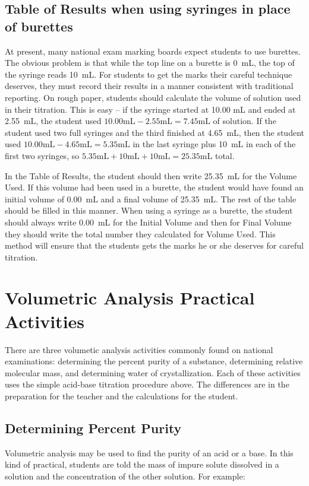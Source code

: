 \subsection{Table of Results when using syringes in place of burettes}

At present, many national exam marking boards expect students to use burettes. The obvious problem is that while the top line on a burette is 0~mL, the top of the syringe reads 10~mL. For students to get the marks their careful technique deserves, they must record their results in a manner consistent with traditional reporting. On rough paper, students should calculate the volume of solution used in their titration. This is easy -- if the syringe started at 10.00 mL and ended at 2.55~mL, the student used $10.00 \mathrm{mL} - 2.55 \mathrm{mL} = 7.45 \mathrm{mL}$ of solution. If the student used two full syringes and the third finished at 4.65~mL, then the student used $10.00 \mathrm{mL} - 4.65 \mathrm{mL} = 5.35 \mathrm{mL}$ in the last syringe plus 10~mL in each of the first two syringes, so $5.35 \mathrm{mL} + 10 \mathrm{mL} + 10 \mathrm{mL} = 25.35 \mathrm{mL}$ total.

In the Table of Results, the student should then write 25.35~mL for the Volume Used. If this volume had been used in a burette, the student would have found an initial volume of 0.00~mL and a final volume of 25.35~mL. The rest of the table should be filled in this manner. When using a syringe as a burette, the student should always write 0.00~mL for the Initial Volume and then for Final Volume they should write the total number they calculated for Volume Used. This method will ensure that the students gets the marks he or she deserves for careful titration. 

\section{Volumetric Analysis Practical Activities}

There are three volumetic analysis activities commonly found on national examinations: determining the percent purity of a substance, determining relative molecular mass, and determining water of crystallization. Each of these activities uses the simple acid-base titration procedure above. The differences are in the preparation for the teacher and the calculations for the student.

\subsection{Determining Percent Purity}
Volumetric analysis may be used to find the purity of an acid or a base. In this kind of practical, students are told the mass of impure solute dissolved in a solution and the concentration of the other solution. 
For example: 

